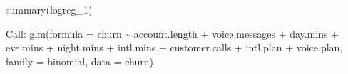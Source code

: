 \documentclass[
  11pt,
]{book}
\makeatletter
\newenvironment{Shaded}{}{}
\newcommand{\AttributeTok}[1]{#1}
\newcommand{\FunctionTok}[1]{#1}
\newcommand{\NormalTok}[1]{#1}
\newcommand{\SpecialCharTok}[1]{\textcolor[rgb]{0.39,0.39,0.39}{#1}}
\newenvironment{kframe}{%
\medskip{}
\setlength{\fboxsep}{.8em}
 \def\at@end@of@kframe{}%
 \ifinner\ifhmode%
  \def\at@end@of@kframe{\end{minipage}}%
  \begin{minipage}{\columnwidth}%
 \fi\fi%
 \def\FrameCommand##1{\hskip\@totalleftmargin \hskip-\fboxsep
 \colorbox{shadecolor}{##1}\hskip-\fboxsep
     \hskip-\linewidth \hskip-\@totalleftmargin \hskip\columnwidth}%
 \MakeFramed {\advance\hsize-\width
   \@totalleftmargin\z@ \linewidth\hsize
   \@setminipage}}%
 {\par\unskip\endMakeFramed%
 \at@end@of@kframe}
\renewenvironment{Shaded}{\begin{kframe}}{\end{kframe}}
\theoremstyle{definition}
\theoremstyle{definition}
\theoremstyle{definition}
\theoremstyle{definition}
\theoremstyle{remark}
\makeatother
\begin{document}
\begin{Shaded}
\begin{Highlighting}[]
\FunctionTok{summary}\NormalTok{(logreg\_1)}
   
\NormalTok{   Call}\SpecialCharTok{:}
   \FunctionTok{glm}\NormalTok{(}\AttributeTok{formula =}\NormalTok{ churn }\SpecialCharTok{\textasciitilde{}}\NormalTok{ account.length }\SpecialCharTok{+}\NormalTok{ voice.messages }\SpecialCharTok{+}\NormalTok{ day.mins }\SpecialCharTok{+} 
\NormalTok{       eve.mins }\SpecialCharTok{+}\NormalTok{ night.mins }\SpecialCharTok{+}\NormalTok{ intl.mins }\SpecialCharTok{+}\NormalTok{ customer.calls }\SpecialCharTok{+}\NormalTok{ intl.plan }\SpecialCharTok{+} 
\NormalTok{       voice.plan, }\AttributeTok{family =}\NormalTok{ binomial, }\AttributeTok{data =}\NormalTok{ churn)}
   

\end{Highlighting}
\end{Shaded}
\end{document}
